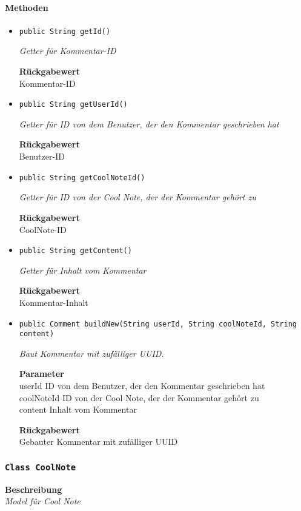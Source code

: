     \paragraph*{Methoden}
    \begin{itemize}
    	\item{\texttt{public String getId()}}
    	
    	\textit{Getter für Kommentar-ID}
    	
    	
    	
    	\textbf{Rückgabewert} \\
    	Kommentar-ID        \item{\texttt{public String getUserId()}}
    	
    	\textit{Getter für ID von dem Benutzer, der den Kommentar geschrieben hat}
    	
    	
    	
    	\textbf{Rückgabewert} \\
    	Benutzer-ID        \item{\texttt{public String getCoolNoteId()}}
    	
    	\textit{Getter für ID von der Cool Note, der der Kommentar gehört zu}
    	
    	
    	
    	\textbf{Rückgabewert} \\
    	CoolNote-ID        \item{\texttt{public String getContent()}}
    	
    	\textit{Getter für Inhalt vom Kommentar}
    	
    	
    	
    	\textbf{Rückgabewert} \\
    	Kommentar-Inhalt        \item{\texttt{public Comment buildNew(String userId, String coolNoteId, String content)}}
    	
    	\textit{Baut Kommentar mit zufälliger UUID.}
    	
    	\textbf{Parameter} \\
    	userId ID von dem Benutzer, der den Kommentar geschrieben hat\\
    	coolNoteId ID von der Cool Note, der der Kommentar gehört zu\\
    	content Inhalt vom Kommentar
    	
    	\textbf{Rückgabewert} \\
    	Gebauter Kommentar mit zufälliger UUID
    \end{itemize}
    \subsubsection{\texttt{Class CoolNote}}
    \textbf{Beschreibung} \\
    \textit{Model für Cool Note}
